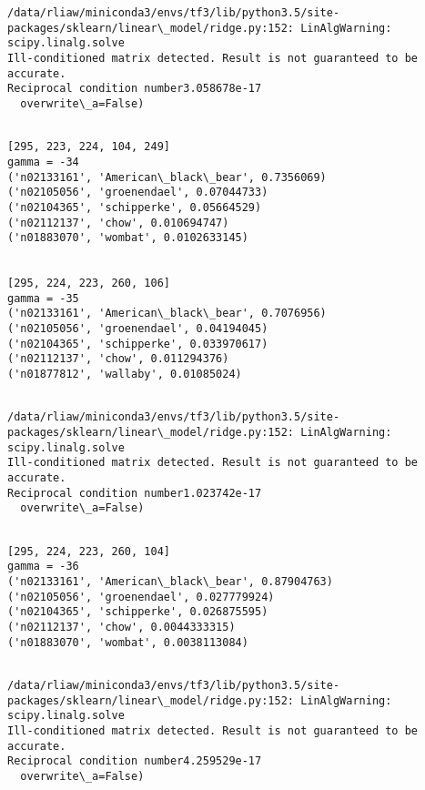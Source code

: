 \documentclass[11pt]{article}
\begin{document}
    \begin{Verbatim}[commandchars=\\\{\}]
/data/rliaw/miniconda3/envs/tf3/lib/python3.5/site-packages/sklearn/linear\_model/ridge.py:152: LinAlgWarning: scipy.linalg.solve
Ill-conditioned matrix detected. Result is not guaranteed to be accurate.
Reciprocal condition number3.058678e-17
  overwrite\_a=False)

    \end{Verbatim}

    \begin{Verbatim}[commandchars=\\\{\}]

[295, 223, 224, 104, 249]
gamma = -34
('n02133161', 'American\_black\_bear', 0.7356069)
('n02105056', 'groenendael', 0.07044733)
('n02104365', 'schipperke', 0.05664529)
('n02112137', 'chow', 0.010694747)
('n01883070', 'wombat', 0.0102633145)


[295, 224, 223, 260, 106]
gamma = -35
('n02133161', 'American\_black\_bear', 0.7076956)
('n02105056', 'groenendael', 0.04194045)
('n02104365', 'schipperke', 0.033970617)
('n02112137', 'chow', 0.011294376)
('n01877812', 'wallaby', 0.01085024)


    \end{Verbatim}

    \begin{Verbatim}[commandchars=\\\{\}]
/data/rliaw/miniconda3/envs/tf3/lib/python3.5/site-packages/sklearn/linear\_model/ridge.py:152: LinAlgWarning: scipy.linalg.solve
Ill-conditioned matrix detected. Result is not guaranteed to be accurate.
Reciprocal condition number1.023742e-17
  overwrite\_a=False)

    \end{Verbatim}

    \begin{Verbatim}[commandchars=\\\{\}]

[295, 224, 223, 260, 104]
gamma = -36
('n02133161', 'American\_black\_bear', 0.87904763)
('n02105056', 'groenendael', 0.027779924)
('n02104365', 'schipperke', 0.026875595)
('n02112137', 'chow', 0.0044333315)
('n01883070', 'wombat', 0.0038113084)


    \end{Verbatim}

    \begin{Verbatim}[commandchars=\\\{\}]
/data/rliaw/miniconda3/envs/tf3/lib/python3.5/site-packages/sklearn/linear\_model/ridge.py:152: LinAlgWarning: scipy.linalg.solve
Ill-conditioned matrix detected. Result is not guaranteed to be accurate.
Reciprocal condition number4.259529e-17
  overwrite\_a=False)

    \end{Verbatim}
\end{document}
